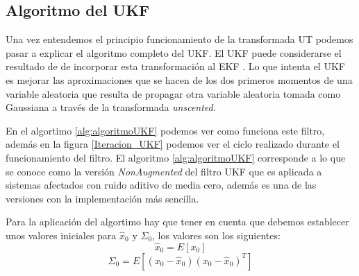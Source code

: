 \subsection{Algoritmo del UKF}
Una vez entendemos el principio funcionamiento de la transformada UT podemos pasar a explicar el algoritmo completo del \ac{UKF}.
El \ac{UKF} puede considerarse el resultado de de incorporar esta transformación al \ac{EKF} \cite{_leyton_2009}.
Lo que intenta el \ac{UKF} es mejorar las aproximaciones que se hacen de los dos primeros momentos de una variable aleatoria que resulta de propagar otra variable aleatoria tomada como Gaussiana a través de la transformada \textit{unscented}.

En el algortimo \ref{alg:algoritmoUKF} podemos ver como funciona este filtro, además en la figura \ref{Iteracion_UKF} podemos ver el ciclo realizado durante el funcionamiento del filtro.
El algoritmo \ref{alg:algoritmoUKF} corresponde a lo que se conoce como la versión \textit{NonAugmented} del filtro \ac{UKF} que es aplicada a sistemas afectados con ruido aditivo de media cero, además es una de las versiones con la implementación más sencilla.

Para la aplicación del algortimo hay que tener en cuenta que debemos establecer unos valores iniciales para $\hat{x}_{0}$ y $\Sigma_{0}$, los valores son los siguientes:
\begin{equation}\label{Ec:Trans_UT_9}
\hat{x}_{0} = E[x_{0}]
\end{equation}
\begin{equation}\label{Ec:Trans_UT_10}
\Sigma_{0} = E[(x_{0}-\hat{x}_{0})(x_{0}-\hat{x}_{0})^{T}]
\end{equation}

